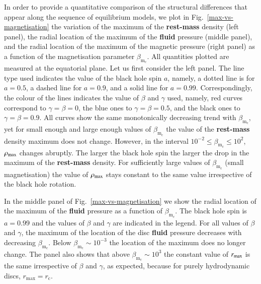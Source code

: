 \documentclass[]{aa}
\begin{document}
In order to provide a quantitative comparison of the structural differences that appear along the sequence of equilibrium models, we plot in Fig.~\ref{max-vs-magnetisation} the variation of the maximum of the {\bf rest-mass} density (left panel), the radial location of the maximum of the {\bf fluid} pressure (middle panel), and the radial location of the maximum of the magnetic pressure (right panel) as a function of the magnetisation parameter $\beta_{\mathrm{m}_{\mathrm{c}}}$. All quantities plotted are measured at the equatorial plane. Let us first consider the left panel. The line type used indicates the value of the black hole spin $a$, namely, a dotted line is for $a=0.5$, a dashed line for $a=0.9$, and a solid line for $a=0.99$. Correspondingly, the colour of the lines indicates the value of $\beta$ and $\gamma$ used, namely, red curves correspond to $\gamma=\beta=0$, the blue ones to $\gamma=\beta=0.5$, and the black ones to $\gamma=\beta=0.9$. All curves show the same monotonically decreasing trend with $\beta_{\mathrm{m}_{\mathrm{c}}}$, yet for small enough and large enough values of $\beta_{\mathrm{m}_{\mathrm{c}}} $ the value of the {\bf rest-mass} density maximum does not change. However, in the interval $10^{-2}\le \beta_{\mathrm{m}_{\mathrm{c}}} \le 10^{2}$, $\rho_{\rm max}$ changes abruptly. The larger the black hole spin the larger the drop in the maximum of the {\bf rest-mass} density. For sufficiently large values of $\beta_{\mathrm{m}_{\mathrm{c}}}$ (small magnetisation) the value of $\rho_{\rm max}$ stays constant to the same value irrespective of the black hole rotation.

In the middle panel of Fig.~\ref{max-vs-magnetisation} we show the radial location of the maximum of the {\bf fluid} pressure as a function of $\beta_{\mathrm{m}_{\mathrm{c}}}$. The black hole spin is $a=0.99$ and the values of $\beta$ and $\gamma$ are indicated in the legend. For all values of $\beta$ and $\gamma$, the maximum of the location of the disc {\bf fluid} pressure decreases with decreasing $\beta_{\mathrm{m}_{\mathrm{c}}}$. Below $\beta_{\mathrm{m}_{\mathrm{c}}}\sim 10^{-3}$ the location of the maximum does no longer change. The panel also shows that above $\beta_{\mathrm{m}_{\mathrm{c}}}\sim 10^{3}$ the constant value of $r_{\rm max}$ is the same irrespective of $\beta$ and $\gamma$, as expected, because for purely hydrodynamic discs, $r_{\mathrm{max}} = r_{\mathrm{c}}$.
\end{document}
